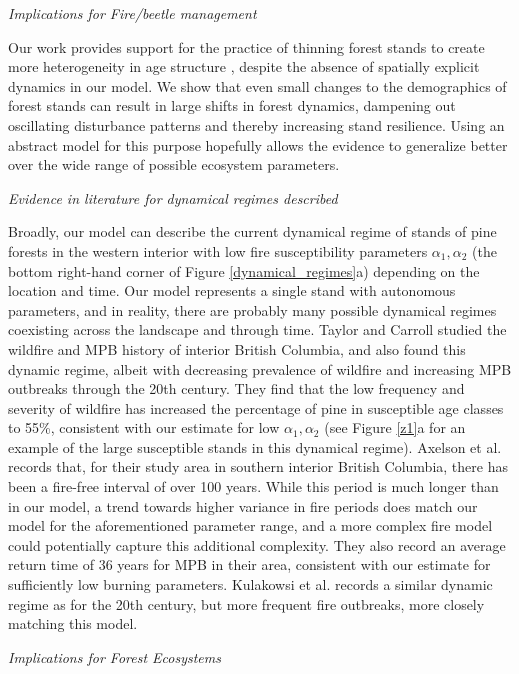 \textit{Implications for Fire/beetle management}

Our work provides support for the practice of thinning forest stands to create more heterogeneity in age structure \cite{jenkins2012fuels,negron2017large}, despite the absence of spatially explicit dynamics in our model. We show that even small changes to the demographics of forest stands can result in large shifts in forest dynamics, dampening out oscillating disturbance patterns and thereby increasing stand resilience. Using an abstract model for this purpose hopefully allows the evidence to generalize better over the wide range of possible ecosystem parameters.

\textit{Evidence in literature for dynamical regimes described}

Broadly, our model can describe the current dynamical regime of stands of pine forests in the western interior with low fire susceptibility parameters $\alpha_1,\alpha_2$ (the bottom right-hand corner of Figure \ref{dynamical_regimes}a) depending on the location and time. Our model represents a single stand with autonomous parameters, and in reality, there are probably many possible dynamical regimes coexisting across the landscape and through time. Taylor and Carroll \cite{taylor2003disturbance} studied the wildfire and MPB history of interior British Columbia, and also found this dynamic regime, albeit with decreasing prevalence of wildfire and increasing MPB outbreaks through the 20th century. They find that the low frequency and severity of wildfire has increased the percentage of pine in susceptible age classes to 55\%, consistent with our estimate for low $\alpha_1,\alpha_2$ (see Figure \ref{z1}a for an example of the large susceptible stands in this dynamical regime). Axelson et al. \cite{axelson2009influence} records that, for their study area in southern interior British Columbia, there has been a fire-free interval of over 100 years. While this period is much longer than in our model, a trend towards higher variance in fire periods does match our model for the aforementioned parameter range, and a more complex fire model could potentially capture this additional complexity. They also record an average return time of 36 years for MPB in their area, consistent with our estimate for sufficiently low burning parameters. Kulakowsi et al. \cite{kulakowski2012stand} records a similar dynamic regime as \cite{axelson2009influence} for the 20th century, but more frequent fire outbreaks, more closely matching this model. 

\textit{Implications for Forest Ecosystems}

